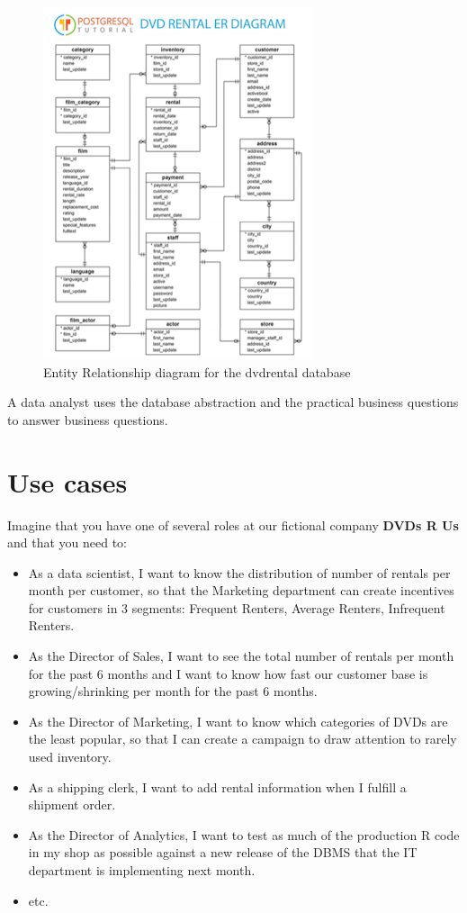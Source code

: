 \documentclass[]{book}
\providecommand{\tightlist}{%
  \setlength{\itemsep}{0pt}\setlength{\parskip}{0pt}}
\theoremstyle{definition}
\theoremstyle{definition}
\theoremstyle{definition}
\theoremstyle{remark}
\begin{document}
\begin{figure}
\centering
\includegraphics{./screenshots/dvdrental-er-diagram.png}
\caption{Entity Relationship diagram for the dvdrental database}
\end{figure}

A data analyst uses the database abstraction and the practical business
questions to answer business questions.

\hypertarget{use-cases}{%
\section{Use cases}\label{use-cases}}

Imagine that you have one of several roles at our fictional company
\textbf{DVDs R Us} and that you need to:

\begin{itemize}
\tightlist
\item
  As a data scientist, I want to know the distribution of number of
  rentals per month per customer, so that the Marketing department can
  create incentives for customers in 3 segments: Frequent Renters,
  Average Renters, Infrequent Renters.
\item
  As the Director of Sales, I want to see the total number of rentals
  per month for the past 6 months and I want to know how fast our
  customer base is growing/shrinking per month for the past 6 months.
\item
  As the Director of Marketing, I want to know which categories of DVDs
  are the least popular, so that I can create a campaign to draw
  attention to rarely used inventory.
\item
  As a shipping clerk, I want to add rental information when I fulfill a
  shipment order.
\item
  As the Director of Analytics, I want to test as much of the production
  R code in my shop as possible against a new release of the DBMS that
  the IT department is implementing next month.
\item
  etc.
\end{itemize}
\end{document}

